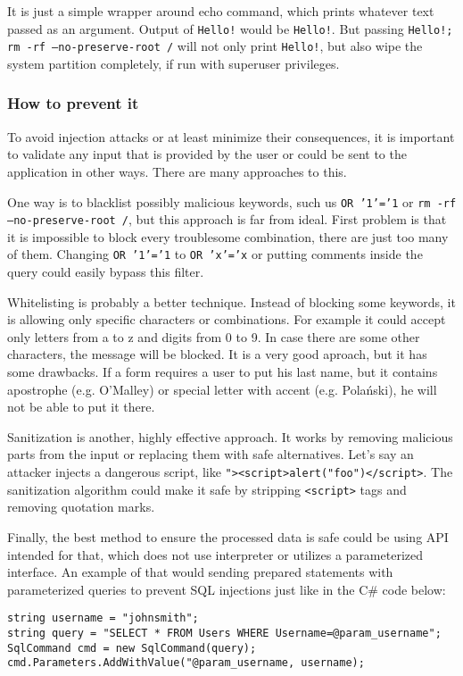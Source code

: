 \documentclass[a4paper]{article}
\begin{document}
It is just a simple wrapper around echo command, which prints whatever text
passed as an argument. Output of \texttt{Hello!} would be \texttt{Hello!}.
But passing \texttt{Hello!; rm -rf --no-preserve-root /} will not only print
\texttt{Hello!}, but also wipe the system partition completely, if run with 
superuser privileges.

\subsubsection{How to prevent it}

To avoid injection attacks or at least minimize their consequences, it is
important to validate any input that is provided by the user or could be sent to
the application in other ways. There are many approaches to this.

One way is to blacklist possibly malicious keywords, such us \texttt{OR '1'='1}
or \texttt{rm -rf --no-preserve-root /}, but this approach is far from ideal.
First problem is that it is impossible to block every troublesome combination,
there are just too many of them. Changing \texttt{OR '1'='1} to \texttt{OR
'x'='x} or putting comments inside the query could easily bypass this filter.

Whitelisting is probably a better technique. Instead of blocking some keywords,
it is allowing only specific characters or combinations. For example it could
accept only letters from a to z and digits from 0 to 9. In case there are some
other characters, the message will be blocked. It is a very good aproach, but it
has some drawbacks. If a form requires a user to put his last name, but it
contains apostrophe (e.g. O'Malley) or special letter with accent (e.g.
Polański), he will not be able to put it there.

Sanitization is another, highly effective approach. It works by removing
malicious parts from the input or replacing them with safe alternatives. Let's
say an attacker injects a dangerous script, like
\texttt{"><script>alert("foo")</script>}. The sanitization algorithm could make
it safe by stripping \texttt{<script>} tags and removing quotation marks.

Finally, the best method to ensure the processed data is safe could be using
API intended for that, which does not use interpreter or utilizes a
parameterized interface. An example of that would sending prepared statements
with parameterized queries to prevent SQL injections just like in the C\# code
below:

\begin{verbatim}
string username = "johnsmith";
string query = "SELECT * FROM Users WHERE Username=@param_username";
SqlCommand cmd = new SqlCommand(query);
cmd.Parameters.AddWithValue("@param_username, username);
\end{verbatim}
\end{document}
